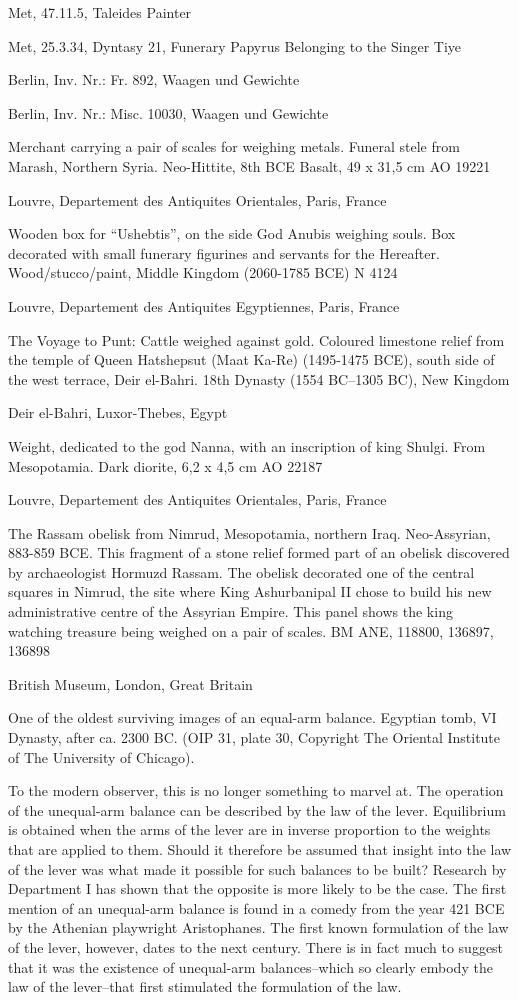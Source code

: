 \documentclass{article}
\begin{document}
Met, 47.11.5, Taleides Painter

Met, 25.3.34, Dyntasy 21, Funerary Papyrus Belonging to the Singer Tiye

Berlin, Inv. Nr.: Fr. 892, Waagen und Gewichte 

Berlin, Inv. Nr.: Misc. 10030, Waagen und Gewichte 

Merchant carrying a pair of scales for weighing metals. Funeral stele from Marash, Northern Syria. Neo-Hittite, 8th BCE Basalt, 49 x 31,5 cm AO 19221 

Louvre, Departement des Antiquites Orientales, Paris, France


Wooden box for ``Ushebtis'', on the side God Anubis weighing souls. Box decorated with small funerary figurines and servants for the Hereafter. Wood/stucco/paint, Middle Kingdom (2060-1785 BCE) N 4124 

Louvre, Departement des Antiquites Egyptiennes, Paris, France

The Voyage to Punt: Cattle weighed against gold. Coloured limestone relief from the temple of Queen Hatshepsut (Maat Ka-Re) (1495-1475 BCE), south side of the west terrace, Deir el-Bahri. 18th Dynasty (1554 BC--1305 BC), New Kingdom 

Deir el-Bahri, Luxor-Thebes, Egypt

Weight, dedicated to the god Nanna, with an inscription of king Shulgi. From Mesopotamia. Dark diorite, 6,2 x 4,5 cm AO 22187 

Louvre, Departement des Antiquites Orientales, Paris, France

The Rassam obelisk from Nimrud, Mesopotamia, northern Iraq. Neo-Assyrian, 883-859 BCE. This fragment of a stone relief formed part of an obelisk discovered by archaeologist Hormuzd Rassam. The obelisk decorated one of the central squares in Nimrud, the site where King Ashurbanipal II chose to build his new administrative centre of the Assyrian Empire. This panel shows the king watching treasure being weighed on a pair of scales. BM ANE, 118800,
136897, 136898 

British Museum, London, Great Britain

One of the oldest surviving images of an equal-arm balance. Egyptian tomb, VI Dynasty, after ca. 2300 BC. (OIP 31, plate 30, Copyright The Oriental Institute of The University of Chicago).

To the modern observer, this is no longer something to marvel at. The operation of the unequal-arm balance can be described by the law of the lever. Equilibrium is obtained when the arms of the lever are in inverse proportion to the weights that are applied to them. Should it therefore be assumed that insight into the law of the lever was what made it possible for such balances to be built? Research by Department I has shown that the opposite is more likely to be the case. The first mention of an unequal-arm balance is found in a comedy from the year 421 BCE by the Athenian playwright Aristophanes. The first known formulation of the law of the lever, however, dates to the next century. There is in fact much to suggest that it was the existence of unequal-arm balances--which so clearly embody the law of the lever--that first stimulated the formulation of the law.
\end{document}
